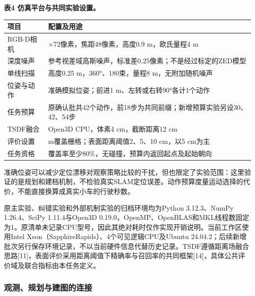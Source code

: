 \documentclass[11pt,a4paper]{article}
\newlength{\ReviewTableWidth}
\begin{document}
\par\noindent\begin{minipage}{\linewidth}
\textbf{表4 仿真平台与共同实验设置。}

\begin{center}
\small
\setlength{\tabcolsep}{4pt}
\setlength{\ReviewTableWidth}{\dimexpr\linewidth-2\tabcolsep\relax}
\begin{tabular}{@{}>{\raggedright\arraybackslash}p{0.24\ReviewTableWidth} >{\raggedright\arraybackslash}p{0.76\ReviewTableWidth}@{}}
\toprule
项目 & 配置及用途 \\
\midrule
RGB-D相机 & 96×72像素，焦距48像素，高度0.9 m，欧氏量程4 m \\
深度噪声 & 参考视差域高斯噪声，标准差0.25像素；不是经过标定的ZED模型 \\
单线扫描 & 高度0.25 m，360°、180束，量程8 m，无附加随机噪声 \\
位姿与动作 & 准确模拟位姿；前进1 m、左转或右转90°各计1个动作 \\
任务预算 & 原确认批共42个动作，前18步为共同前缀；新增预算实验另设30、42、54步 \\
TSDF融合 & Open3D CPU，体素4 cm，截断距离12 cm \\
评价设置 & 0.2 m覆盖栅格；表面距离阈值2、5、10 cm，以5 cm为主 \\
任务资格 & 覆盖率至少80\%，无碰撞，预算内返回起点及起始朝向 \\
\bottomrule
\end{tabular}
\end{center}
\end{minipage}


准确位姿可以减少定位漂移对观察策略比较的干扰，但也限定了实验范围：这里验证的是规划和建档机制，不检验真实SLAM定位误差。动作预算度量运动选择的代价，不能直接换算成真实小车的行驶秒数。

原主实验、纠错实验和外部机制实验的归档环境均为Python 3.12.3、NumPy 1.26.4、SciPy 1.11.4与Open3D 0.19.0，OpenMP、OpenBLAS和MKL线程数固定为1。原清单未记录CPU型号，因此其绝对耗时仅作实现开销说明。当前工作区使用Intel Xeon（SapphireRapids）、4个可见逻辑CPU及Ubuntu 24.04.2；后续新增批次另行保存环境记录，不以当前硬件信息代替历史记录。TSDF遵循距离场融合思路{[}11{]}，表面评价采用距离阈值下精确率与召回率的共同框架{[}14{]}，具体公共评价域及联合指标由本任务定义。

\hypertarget{ux89c2ux6d4bux89c4ux5212ux4e0eux5efaux56feux7684ux8fdeux63a5}{%
\subsubsection{观测、规划与建图的连接}\label{ux89c2ux6d4bux89c4ux5212ux4e0eux5efaux56feux7684ux8fdeux63a5}}
\end{document}
